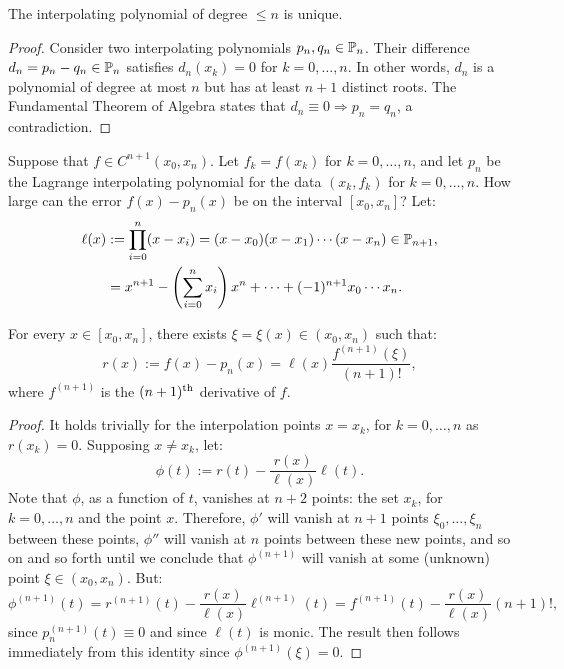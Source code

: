 \begin{theorem}\label{theorem:polyuniqueness}
The interpolating polynomial of degree $\le n$ is unique.
\end{theorem}
\begin{proof}
Consider two interpolating polynomials $p_n,q_n\in\P_n$. Their difference $d_n=p_n-q_n\in\P_n$ satisfies $d_n(x_k) = 0$ for $k=0,\ldots,n$. In other words, $d_n$ is a polynomial of degree at most $n$ but has at least $n+1$ distinct roots. The Fundamental Theorem of Algebra states that $d_n\equiv 0\Rightarrow p_n=q_n$, a contradiction.
\end{proof}

Suppose that $f\in C^{n+1}(x_0,x_n)$. Let $f_k = f(x_k)$ for $k=0,\ldots,n$, and let $p_n$ be the Lagrange interpolating polynomial for the data $(x_k,f_k)$ for $k=0,\ldots,n$. How large can the error $f(x)-p_n(x)$ be on the interval $[x_0,x_n]$? Let:
\begin{align}
\ell(x) & := \prod_{i=0}^n(x-x_i) = (x-x_0)(x-x_1)\cdots(x-x_n)\in\P_{n+1},\label{eq:Omega}\\
& = x^{n+1} - \pr(\sum_{i=0}^nx_i)x^n +\cdots+(-1)^{n+1}x_0\cdots x_n.\nonumber
\end{align}

\begin{theorem}\label{theorem:LagrangeInterpolatingRemainder}
For every $x\in[x_0,x_n]$, there exists $\xi = \xi(x) \in (x_0,x_n)$ such that:
\[
r(x) := f(x)-p_n(x) = \ell(x)\dfrac{f^{(n+1)}(\xi)}{(n+1)!},
\]
where $f^{(n+1)}$ is the $(n+1)^{\rm th}$ derivative of $f$.
\end{theorem}
\begin{proof}
It holds trivially for the interpolation points $x=x_k$, for $k=0,\ldots,n$ as $r(x_k) = 0$. Supposing $x\ne x_k$, let:
\[
\phi(t) := r(t) - \dfrac{r(x)}{\ell(x)}\ell(t).
\]
Note that $\phi$, as a function of $t$, vanishes at $n+2$ points: the set $x_k$, for $k=0,\ldots,n$ and the point $x$. Therefore, $\phi'$ will vanish at $n+1$ points $\xi_0,\ldots,\xi_n$ between these points, $\phi''$ will vanish at $n$ points between these new points, and so on and so forth until we conclude that $\phi^{(n+1)}$ will vanish at some (unknown) point $\xi\in(x_0,x_n)$. But:
\[
\phi^{(n+1)}(t) = r^{(n+1)}(t) - \dfrac{r(x)}{\ell(x)}\ell^{(n+1)}(t) = f^{(n+1)}(t) - \dfrac{r(x)}{\ell(x)}(n+1)!,
\]
since $p_n^{(n+1)}(t) \equiv 0$ and since $\ell(t)$ is monic. The result then follows immediately from this identity since $\phi^{(n+1)}(\xi) = 0$.
\end{proof}

